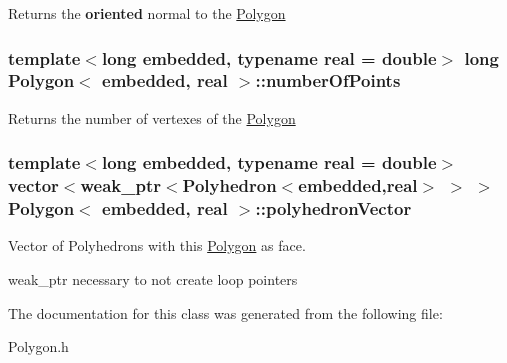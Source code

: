 \begin{DoxyReturn}{\-Returns}
the {\bfseries oriented} normal to the \hyperlink{class_polygon}{\-Polygon} 
\end{DoxyReturn}
\hypertarget{class_polygon_a84d5ff2931fc01477beb2acc4c7448fb}{
\subsubsection[{number\-Of\-Points}]{\setlength{\rightskip}{0pt plus 5cm}template$<$long embedded, typename real = double$>$ long {\bf \-Polygon}$<$ embedded, real $>$\-::{\bf number\-Of\-Points}}}\label{class_polygon_a84d5ff2931fc01477beb2acc4c7448fb}
\begin{DoxyReturn}{\-Returns}
the number of vertexes of the \hyperlink{class_polygon}{\-Polygon} 
\end{DoxyReturn}
\hypertarget{class_polygon_aac6777656621ccf17a4a6f144000cd56}{
\subsubsection[{polyhedron\-Vector}]{\setlength{\rightskip}{0pt plus 5cm}template$<$long embedded, typename real = double$>$ vector$<$weak\-\_\-ptr$<${\bf \-Polyhedron}$<$embedded,real$>$ $>$ $>$ {\bf \-Polygon}$<$ embedded, real $>$\-::{\bf polyhedron\-Vector}}}\label{class_polygon_aac6777656621ccf17a4a6f144000cd56}


\-Vector of \-Polyhedrons with this \hyperlink{class_polygon}{\-Polygon} as face. 

weak\-\_\-ptr necessary to not create loop pointers 

\-The documentation for this class was generated from the following file\-:\begin{DoxyCompactItemize}
\item 
\-Polygon.\-h\end{DoxyCompactItemize}
